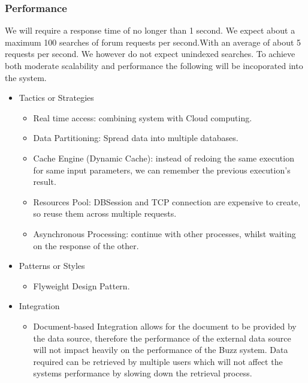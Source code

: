 \subsubsection{Performance}
		We will require a response time of no longer than 1 second. We expect about a maximum 100 searches of forum requests per second.With an average of about 5 requests per second. We however do not expect unindexed searches. To achieve both moderate scalability and performance the following will be incoporated into the system.
		\begin{itemize}
	\item{Tactics or Strategies}
		\begin{itemize}
			\item Real time access: combining system with Cloud computing.
			\item Data Partitioning: Spread data into multiple databases.
			\item Cache Engine (Dynamic Cache): instead of redoing the same execution for same input parameters, we can remember the previous execution's result.
			\item Resources Pool: DBSession and TCP connection are expensive to create, so reuse them across multiple requests.
			\item Asynchronous Processing: continue with other processes, whilst waiting on the response of the other.
		\end{itemize}
	\item{Patterns or Styles}
		\begin{itemize}
			\item Flyweight Design Pattern.
		\end{itemize}
	\item{Integration}
		\begin{itemize}
			\item Document-based Integration allows for the document to be provided by the data source, therefore the performance of the external data source will not impact heavily on the performance of the Buzz system. Data required can be retrieved by multiple users which will not affect the systems performance by slowing down the retrieval process. 
		\end{itemize}
\end{itemize}
